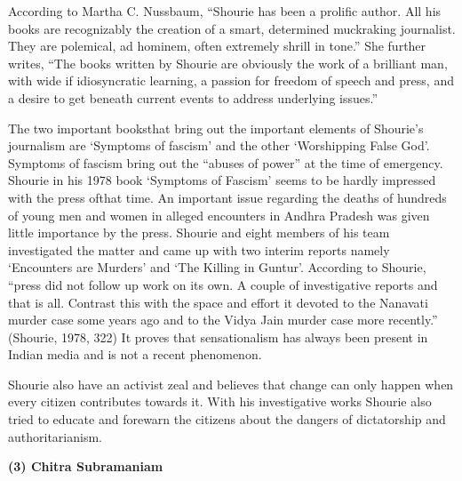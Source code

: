 \begin{multicols}{2}
\vspace{-.1cm}

\noi
According to Martha C. Nussbaum, “Shourie has been a prolific author. All his books are
recognizably the creation of a smart, determined muckraking journalist. They are polemical,
ad hominem, often extremely shrill in tone.” She further writes, “The books written by Shourie
are obviously the work of a brilliant man, with wide if idiosyncratic learning, a passion for freedom of speech and press, and a desire to get beneath current events to address underlying issues.”

\vspace{.1cm}

\noi
The two important booksthat bring out the important elements of Shourie’s journalism
are ‘Symptoms of fascism’ and the other ‘Worshipping False God’. Symptoms of fascism bring
out the “abuses of power” at the time of emergency. Shourie in his 1978 book ‘Symptoms of
Fascism’ seems to be hardly impressed with the press ofthat time. An important issue regarding
the deaths of hundreds of young men and women in alleged encounters in Andhra Pradesh was
given little importance by the press. Shourie and eight members of his team investigated the
matter and came up with two interim reports namely ‘Encounters are Murders’ and ‘The Killing
in Guntur’. According to Shourie, “press did not follow up work on its own. A couple of
investigative reports and that is all. Contrast this with the space and effort it devoted to the
Nanavati murder case some years ago and to the Vidya Jain murder case more recently.”
(Shourie, 1978, 322) It proves that sensationalism has always been present in Indian media and
is not a recent phenomenon.


\noi
Shourie also have an activist zeal and believes that change can only happen when every citizen
contributes towards it. With his investigative works Shourie also tried to educate and forewarn
the citizens about the dangers of dictatorship and authoritarianism.


\noi
{\large \bfseries (3) Chitra Subramaniam}



\end{multicols}
